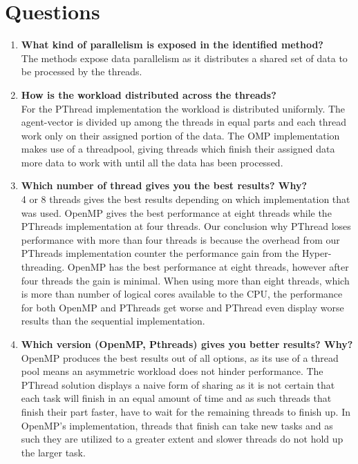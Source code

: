 \documentclass[a4paper,11pt]{article}
\begin{document}
\section{Questions}
\begin{enumerate}[label=\Alph*.]
\item \textbf{What kind of parallelism is exposed in the identified
  method?}\\
  The methods expose data parallelism as it distributes a shared set of data to be processed by the threads.
\item \textbf{How is the workload distributed across the threads?}\\
  For the PThread implementation the workload is distributed uniformly. The agent-vector is divided
  up among the threads in equal parts and each thread work only on their assigned portion of the data.
  The OMP implementation makes use of a threadpool, giving threads which finish their assigned data more data
  to work with until all the data has been processed.
\item \textbf{Which number of thread gives you the best results?
  Why?}\\ 4 or 8 threads gives the best results depending on which
  implementation that was used. OpenMP gives the best performance at eight
  threads while the PThreads implementation at four threads. Our
  conclusion why PThread loses performance with more than four threads is
  because the overhead from our PThreads implementation counter the
  performance gain from the Hyper-threading. OpenMP has the best
  performance at eight threads, however after four threads the gain is
  minimal. When using more than eight threads, which is more than number of
  logical cores available to the CPU, the performance for both OpenMP and PThreads get
  worse and PThread even display worse results than the sequential implementation.
\item \textbf{Which version (OpenMP, Pthreads) gives you better
  results? Why?}\\
  OpenMP produces the best results out of all options, as its use of a thread pool means an
  asymmetric workload does not hinder performance. The PThread solution displays a naive form of sharing as
  it is not certain that each task will finish in an equal amount of time and as such threads that finish their part
  faster, have to wait for the remaining threads to finish up. In OpenMP's implementation, threads that finish can
  take new tasks and as such they are utilized to a greater extent and slower threads do not hold up the larger task.
\end{enumerate}
\end{document}
